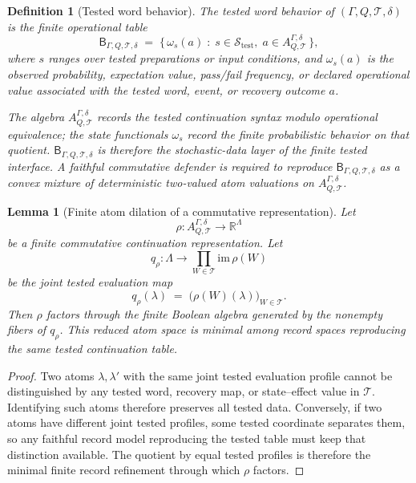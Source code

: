 \documentclass[11pt]{article}
\newtheorem{lemma}[theorem]{Lemma}
\newtheorem{definition}[theorem]{Definition}
\newcommand{\R}{\mathbb R}
\begin{document}
\begin{definition}[Tested word behavior]\label{def:tested-word-behavior}
The \emph{tested word behavior} of $(\Gamma,Q,\mathcal T,\delta)$ is
the finite operational table
\[
    \mathsf B_{\Gamma,Q,\mathcal T,\delta}
    \;=\;
    \bigl\{\,\omega_s(a)\;:\; s\in\mathcal S_{\mathrm{test}},\;
    a\in A^{\Gamma,\delta}_{Q,\mathcal T}\,\bigr\},
\]
where $s$ ranges over tested preparations or input conditions, and
$\omega_s(a)$ is the observed probability, expectation value,
pass/fail frequency, or declared operational value associated with the
tested word, event, or recovery outcome $a$.

The algebra $A^{\Gamma,\delta}_{Q,\mathcal T}$ records the tested
continuation syntax modulo operational equivalence; the state
functionals $\omega_s$ record the finite probabilistic behavior on
that quotient.  $\mathsf B_{\Gamma,Q,\mathcal T,\delta}$ is therefore
the stochastic-data layer of the finite tested interface.  A faithful
commutative defender is required to reproduce
$\mathsf B_{\Gamma,Q,\mathcal T,\delta}$ as a convex mixture of
deterministic two-valued atom valuations on
$A^{\Gamma,\delta}_{Q,\mathcal T}$.
\end{definition}

\begin{lemma}[Finite atom dilation of a commutative representation]\label{lem:finite-atom-dilation}
Let
\[
    \rho:A^{\Gamma,\delta}_{Q,\mathcal T}\to\R^\Lambda
\]
be a finite commutative continuation representation.  Let
\[
    q_\rho:\Lambda\to\prod_{W\in\mathcal T}\mathrm{im}\,\rho(W)
\]
be the joint tested evaluation map
\[
    q_\rho(\lambda) \;=\; \bigl(\rho(W)(\lambda)\bigr)_{W\in\mathcal T}.
\]
Then $\rho$ factors through the finite Boolean algebra generated by the
nonempty fibers of $q_\rho$.  This reduced atom space is minimal among
record spaces reproducing the same tested continuation table.
\end{lemma}
\begin{proof}
Two atoms $\lambda,\lambda'$ with the same joint tested evaluation
profile cannot be distinguished by any tested word, recovery map, or
state--effect value in $\mathcal T$.  Identifying such atoms therefore
preserves all tested data.  Conversely, if two atoms have different
joint tested profiles, some tested coordinate separates them, so any
faithful record model reproducing the tested table must keep that
distinction available.  The quotient by equal tested profiles is
therefore the minimal finite record refinement through which $\rho$
factors.
\end{proof}
\end{document}
